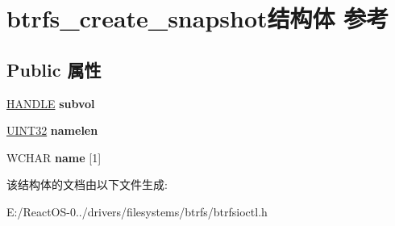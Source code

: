 \hypertarget{structbtrfs__create__snapshot}{}\section{btrfs\+\_\+create\+\_\+snapshot结构体 参考}
\label{structbtrfs__create__snapshot}
\subsection*{Public 属性}
\begin{DoxyCompactItemize}
\item 
\mbox{\label{structbtrfs__create__snapshot_a23a1c1fc961e0f61cfc8861c08fb3c0f}} 
\hyperlink{interfacevoid}{H\+A\+N\+D\+LE} {\bfseries subvol}
\item 
\mbox{\label{structbtrfs__create__snapshot_a9b356ea218d04f7a9877a4b64bc4f674}} 
\hyperlink{_processor_bind_8h_ae1e6edbbc26d6fbc71a90190d0266018}{U\+I\+N\+T32} {\bfseries namelen}
\item 
\mbox{\label{structbtrfs__create__snapshot_a05caae2e364250011b76a4831698adf0}} 
W\+C\+H\+AR {\bfseries name} \mbox{[}1\mbox{]}
\end{DoxyCompactItemize}


该结构体的文档由以下文件生成\+:\begin{DoxyCompactItemize}
\item 
E\+:/\+React\+O\+S-\/0../drivers/filesystems/btrfs/btrfsioctl.\+h\end{DoxyCompactItemize}
